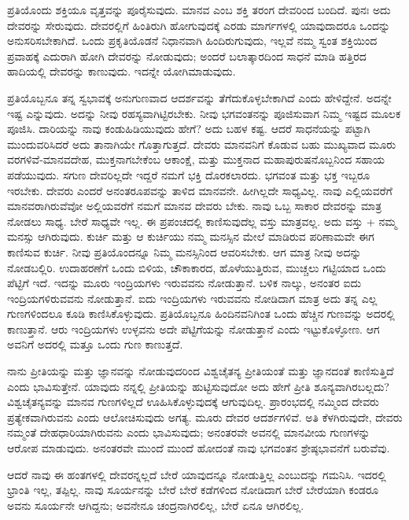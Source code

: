 \vskip 6pt

ಪ್ರತಿಯೊಂದು ಶಕ್ತಿಯೂ ವೃತ್ತವನ್ನು ಪೂರೈಸುವುದು. ಮಾನವ ಎಂಬ ಶಕ್ತಿ ತರಂಗ ದೇವರಿಂದ ಬಂದಿದೆ. ಪುನಃ ಅದು ದೇವರನ್ನು ಸೇರುವುದು. ದೇವರಲ್ಲಿಗೆ ಹಿಂತಿರುಗಿ ಹೋಗುವುದಕ್ಕೆ ಎರಡು ಮಾರ್ಗಗಳಲ್ಲಿ ಯಾವುದಾದರೂ ಒಂದನ್ನು ಅನುಸರಿಸಬೇಕಾಗಿದೆ. ಒಂದು ಪ್ರಕೃತಿಯೊಡನೆ ನಿಧಾನವಾಗಿ ಹಿಂದಿರುಗುವುದು, ಇಲ್ಲವೆ ನಮ್ಮ ಸ್ವಂತ ಶಕ್ತಿಯಿಂದ ಪ್ರವಾಹಕ್ಕೆ ಎದುರಾಗಿ ಹೋಗಿ ದೇವರನ್ನು ನೋಡುವುದು; ಅಂದರೆ ಬಲಾತ್ಕಾರದಿಂದ ಸಾಧನೆ ಮಾಡಿ ಹತ್ತಿರದ ಹಾದಿಯಲ್ಲಿ ದೇವರನ್ನು ಕಾಣುವುದು. ಇದನ್ನೇ ಯೋಗಿ\break ಮಾಡುವುದು.

\vskip 6pt

ಪ್ರತಿಯೊಬ್ಬನೂ ತನ್ನ ಸ್ವಭಾವಕ್ಕೆ ಅನುಗುಣವಾದ ಆದರ್ಶವನ್ನು ತೆಗೆದುಕೊಳ್ಳಬೇಕಾಗಿದೆ ಎಂದು ಹೇಳಿದ್ದೇನೆ. ಅದನ್ನೇ ಇಷ್ಟ ಎನ್ನುವುದು. ಅದನ್ನು ನೀವು ರಹಸ್ಯವಾಗಿಟ್ಟಿರಬೇಕು. ನೀವು ಭಗವಂತನನ್ನು ಪೂಜಿಸುವಾಗ ನಿಮ್ಮ ಇಷ್ಟದ ಮೂಲಕ ಪೂಜಿಸಿ. ದಾರಿಯನ್ನು ನಾವು ಕಂಡುಹಿಡಿಯುವುದು ಹೇಗೆ? ಅದು ಬಹಳ ಕಷ್ಟ. ಆದರೆ ಸಾಧನೆಯನ್ನು ಪಟ್ಟಾಗಿ ಮುಂದುವರಿಸಿದರೆ ಅದು ತಾನಾಗಿಯೇ ಗೊತ್ತಾಗುತ್ತದೆ. ದೇವರು ಮಾನವನಿಗೆ ಕೊಡುವ ಬಹು ಮುಖ್ಯವಾದ ಮೂರು ವರಗಳಿವೆ-ಮಾನವದೇಹ, ಮುಕ್ತನಾಗಬೇಕೆಂಬ ಆಕಾಂಕ್ಷೆ, ಮತ್ತು ಮುಕ್ತನಾದ ಮಹಾಪುರುಷನೊಬ್ಬನಿಂದ ಸಹಾಯ ಪಡೆಯುವುದು. ಸಗುಣ ದೇವರಿಲ್ಲದೇ ಇದ್ದರೆ ನಮಗೆ ಭಕ್ತಿ ದೊರಕಲಾರದು. ಭಗವಂತ ಮತ್ತು ಭಕ್ತ ಇಬ್ಬರೂ ಇರಬೇಕು. ದೇವರು ಎಂದರೆ ಅನಂತರೂಪವನ್ನು ತಾಳಿದ ಮಾನವನೇ. ಹೀಗಿಲ್ಲದೇ ಸಾಧ್ಯವಿಲ್ಲ. ನಾವು ಎಲ್ಲಿಯವರೆಗೆ ಮಾನವರಾಗಿರುವೆವೋ ಅಲ್ಲಿಯವರೆಗೆ ನಮಗೆ ಮಾನವ ದೇವರು ಬೇಕು. ನಾವು ಒಬ್ಬ ಸಾಕಾರ ದೇವರನ್ನು ಮಾತ್ರ ನೋಡಲು ಸಾಧ್ಯ. ಬೇರೆ ಸಾಧ್ಯವೇ ಇಲ್ಲ. ಈ ಪ್ರಪಂಚದಲ್ಲಿ ಕಾಣಿಸುವುದೆಲ್ಲ ವಸ್ತು ಮಾತ್ರವಲ್ಲ. ಅದು ವಸ್ತು + ನಮ್ಮ ಮನಸ್ಸು ಆಗಿರುವುದು. ಕುರ್ಚಿ ಮತ್ತು ಆ ಕುರ್ಚಿಯು ನಮ್ಮ ಮನಸ್ಸಿನ ಮೇಲೆ ಮಾಡಿರುವ ಪರಿಣಾಮವೇ ಈಗ ಕಾಣಿಸುವ ಕುರ್ಚಿ. ನೀವು ಪ್ರತಿಯೊಂದನ್ನೂ ನಿಮ್ಮ ಮನಸ್ಸಿನಿಂದ ಆವರಿಸಬೇಕು. ಆಗ ಮಾತ್ರ ನೀವು ಅದನ್ನು ನೋಡಬಲ್ಲಿರಿ. ಉದಾಹರಣೆಗೆ ಒಂದು ಬಿಳಿಯ, ಚೌಕಾಕಾರದ, ಹೊಳೆಯುತ್ತಿರುವ, ಮುಚ್ಚಲು ಗಟ್ಟಿಯಾದ ಒಂದು ಪೆಟ್ಟಿಗೆ ಇದೆ. ಇದನ್ನು ಮೂರು ಇಂದ್ರಿಯಗಳು ಇರುವವನು ನೋಡುತ್ತಾನೆ. ಬಳಿಕ ನಾಲ್ಕು, ಅನಂತರ ಐದು ಇಂದ್ರಿಯಗಳಿರುವವನು ನೋಡುತ್ತಾನೆ. ಐದು ಇಂದ್ರಿಯಗಳು ಇರುವವನು ನೋಡಿದಾಗ ಮಾತ್ರ ಅದು ತನ್ನ ಎಲ್ಲ ಗುಣಗಳಿಂದಲೂ ಕೂಡಿ ಕಾಣಿಸಿಕೊಳ್ಳುವುದು. ಪ್ರತಿಯೊಬ್ಬನೂ ಹಿಂದಿನವನಿಗಿಂತ ಒಂದು ಹೆಚ್ಚಿನ ಗುಣವನ್ನು ಅದರಲ್ಲಿ ಕಾಣುತ್ತಾನೆ. ಆರು ಇಂದ್ರಿಯಗಳು ಉಳ್ಳವನು ಅದೇ ಪೆಟ್ಟಿಗೆಯನ್ನು ನೋಡುತ್ತಾನೆ ಎಂದು ಇಟ್ಟುಕೊಳ್ಳೋಣ. ಆಗ ಅವನಿಗೆ ಅದರಲ್ಲಿ ಮತ್ತೂ ಒಂದು ಗುಣ ಕಾಣುತ್ತದೆ.

ನಾನು ಪ್ರೀತಿಯನ್ನು ಮತ್ತು ಜ್ಞಾನವನ್ನು ನೋಡುವುದರಿಂದ ವಿಶ್ವಚೈತನ್ಯ ಪ್ರೀತಿಯಂತೆ ಮತ್ತು ಜ್ಞಾನದಂತೆ ಕಾಣಿಸುತ್ತಿದೆ ಎಂದು ಭಾವಿಸುತ್ತೇನೆ. ಯಾವುದು ನನ್ನಲ್ಲಿ ಪ್ರೀತಿಯನ್ನು ಹುಟ್ಟಿಸುವುದೋ ಅದು ಹೇಗೆ ಪ್ರೀತಿ ಶೂನ್ಯವಾಗಿರಬಲ್ಲದು? ವಿಶ್ವಚೈತನ್ಯವನ್ನು ಮಾನವ ಗುಣಗಳಿಲ್ಲದೆ ಊಹಿಸಿಕೊಳ್ಳುವುದಕ್ಕೆ ಆಗುವುದಿಲ್ಲ. ಪ್ರಾರಂಭದಲ್ಲಿ ನಮ್ಮಿಂದ ದೇವರು ಪ್ರತ್ಯೇಕವಾಗಿರುವನು ಎಂದು ಆಲೋಚಿಸುವುದು ಅಗತ್ಯ. ಮೂರು ದೇವರ ಆದರ್ಶಗಳಿವೆ. ಅತಿ ಕೆಳಗಿರುವುದೇ, ದೇವರು ನಮ್ಮಂತೆ ದೇಹಧಾರಿಯಾಗಿರುವನು ಎಂದು ಭಾವಿಸುವುದು; ಅನಂತರವೇ ಅವನಲ್ಲಿ ಮಾನವೀಯ ಗುಣಗಳನ್ನು ಆರೋಪ ಮಾಡುವುದು. ಅನಂತರವೇ ಮುಂದೆ ಮುಂದೆ ಹೋದಂತೆ ನಾವು ಭಗವಂತನ ಶ್ರೇಷ್ಠಭಾವನೆಗೆ ಬರುವೆವು.

ಆದರೆ ನಾವು ಈ ಹಂತಗಳಲ್ಲಿ ದೇವರನ್ನಲ್ಲದೆ ಬೇರೆ ಯಾವುದನ್ನೂ ನೋಡುತ್ತಿಲ್ಲ ಎಂಬುದನ್ನು ಗಮನಿಸಿ. ಇದರಲ್ಲಿ ಭ್ರಾಂತಿ ಇಲ್ಲ, ತಪ್ಪಿಲ್ಲ. ನಾವು ಸೂರ್ಯನನ್ನು ಬೇರೆ ಬೇರೆ ಕಡೆಗಳಿಂದ ನೋಡಿದಾಗ ಬೇರೆ ಬೇರೆಯಾಗಿ ಕಂಡರೂ ಅವನು ಸೂರ್ಯನೇ ಆಗಿದ್ದನು; ಅವನೇನೂ ಚಂದ್ರನಾಗಿರಲಿಲ್ಲ, ಬೇರೆ ಏನೂ ಆಗಿರಲಿಲ್ಲ.

